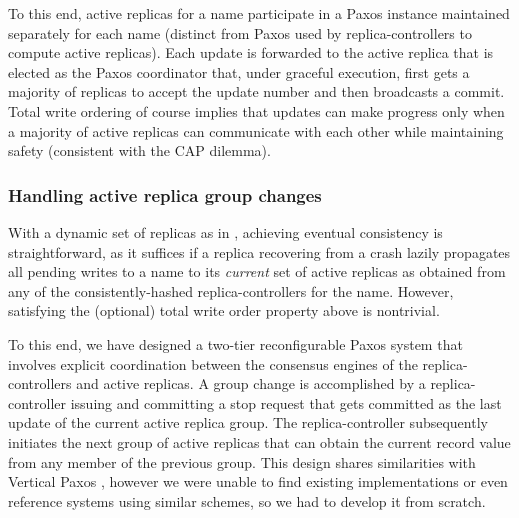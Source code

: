 To this end, active replicas for a name participate in a Paxos instance maintained separately for each name (distinct from Paxos used by replica-controllers to compute active replicas). Each update is forwarded to the active replica that is elected as the Paxos coordinator that, under graceful execution, first gets a majority of replicas to accept the update number and then broadcasts a commit. Total write ordering of course implies that updates can make progress  only when a majority of active replicas can communicate with each other while maintaining safety (consistent with the CAP \cite{CAP} dilemma).



\vsp
\subsubsection{Handling active replica group changes}

With a dynamic set of replicas as in \auspice, achieving eventual consistency is straightforward, as it suffices if a replica recovering from a crash lazily propagates all pending writes to a name to its {\em current} set of active replicas as obtained from any of the consistently-hashed replica-controllers for the name. However, satisfying the (optional) total write order property above is nontrivial.

To this end, we have designed a two-tier reconfigurable Paxos system that involves explicit coordination between the consensus engines of the replica-controllers and active replicas. A group change is accomplished by a replica-controller issuing and committing a stop request \cite{lamport2008stoppable} that gets committed as the last update of the current active replica group. The replica-controller subsequently initiates the next group of active replicas that can obtain the current record value from any member of the previous group. This design shares similarities with Vertical Paxos \cite{vertical-paxos}, however we were unable to find existing implementations or even reference systems using similar schemes, so we had to develop it from scratch.


